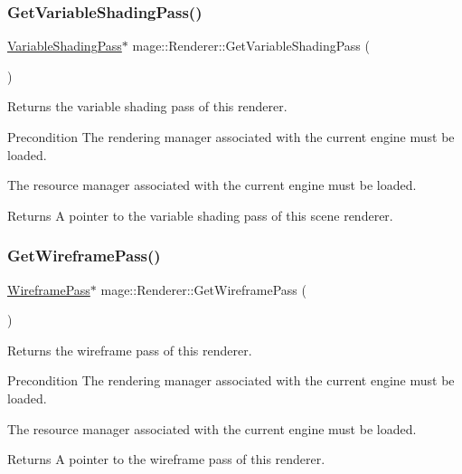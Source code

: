\subsubsection{\texorpdfstring{Get\+Variable\+Shading\+Pass()}{GetVariableShadingPass()}}
{\footnotesize\ttfamily \hyperlink{classmage_1_1_variable_shading_pass}{Variable\+Shading\+Pass}$\ast$ mage\+::\+Renderer\+::\+Get\+Variable\+Shading\+Pass (\begin{DoxyParamCaption}{ }\end{DoxyParamCaption})}

Returns the variable shading pass of this renderer.

\begin{DoxyPrecond}{Precondition}
The rendering manager associated with the current engine must be loaded. 

The resource manager associated with the current engine must be loaded. 
\end{DoxyPrecond}
\begin{DoxyReturn}{Returns}
A pointer to the variable shading pass of this scene renderer. 
\end{DoxyReturn}
\hypertarget{classmage_1_1_renderer_a8069fab64b56b69dca3d9a8a5ebc3f8e}{}\label{classmage_1_1_renderer_a8069fab64b56b69dca3d9a8a5ebc3f8e} 
\subsubsection{\texorpdfstring{Get\+Wireframe\+Pass()}{GetWireframePass()}}
{\footnotesize\ttfamily \hyperlink{classmage_1_1_wireframe_pass}{Wireframe\+Pass}$\ast$ mage\+::\+Renderer\+::\+Get\+Wireframe\+Pass (\begin{DoxyParamCaption}{ }\end{DoxyParamCaption})}

Returns the wireframe pass of this renderer.

\begin{DoxyPrecond}{Precondition}
The rendering manager associated with the current engine must be loaded. 

The resource manager associated with the current engine must be loaded. 
\end{DoxyPrecond}
\begin{DoxyReturn}{Returns}
A pointer to the wireframe pass of this renderer. 
\end{DoxyReturn}
\hypertarget{classmage_1_1_renderer_a2762ead5f771ae95e4293cd7eb1a2834}{}\label{classmage_1_1_renderer_a2762ead5f771ae95e4293cd7eb1a2834} 
